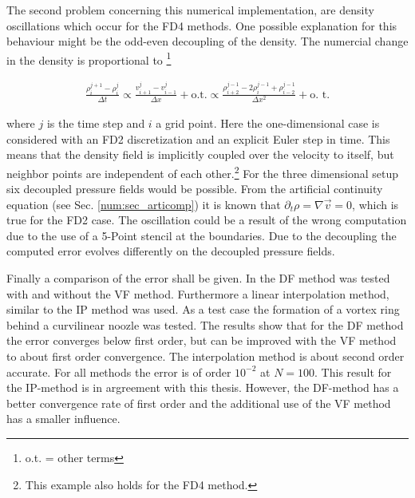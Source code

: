 The second problem concerning this numerical implementation, are density oscillations
which occur for the FD4 methods.
One possible explanation for this behaviour might be the odd-even decoupling of the density.
The numercial change in the density is  proportional to \footnote{o.t. = other terms}


\begin{align}
    \frac{\rho^{j+1}_{i} -  \rho^{j}_i}{\Delta t}  \propto \frac{ v^j_{i+1} - v^j_{i-1}}{\Delta x} + \text{o.t.}
     \propto \frac{\rho^{j-1}_{i+2} - 2 \rho^{j-1}_{i}  + \rho^{j-1}_{i-2}}{\Delta x^2} + \text{o. t.}
\end{align}

where $j$ is the time step and $i$ a grid point. Here the one-dimensional case is considered with an FD2 discretization and an explicit Euler step in time.
This means that the density field is implicitly coupled over the velocity to itself,
but neighbor points are independent of each other.\footnote{This example also holds for the FD4 method.}
For the three dimensional setup six decoupled pressure fields would be possible.
From the artificial continuity equation (see Sec. \ref{num:sec_articomp})
it is known that $\partial_t \rho  = \nabla \vec{v} =  0$, which is true for the FD2 case.
The oscillation could be a result of the  wrong computation due to the use of a 5-Point stencil at the boundaries.
Due to the decoupling the computed error evolves differently on the decoupled pressure fields.

Finally a comparison of the error shall be given.
In \citep{Fadlun2000} the DF method was tested with and without the VF method.
Furthermore a linear interpolation method, similar to the IP method was used.
As a test case the formation of a vortex ring behind a curvilinear noozle was tested.
The results show that for the DF method the error converges below first order, but can be
improved with the VF method to about first order convergence.
The interpolation method is about second order accurate.
For all methods the error is of order $10^{-2}$ at $N=100$.
This result for the IP-method is in argreement with this thesis. However, the DF-method has a better convergence rate of first order and
the additional use of the VF method has a smaller influence.

